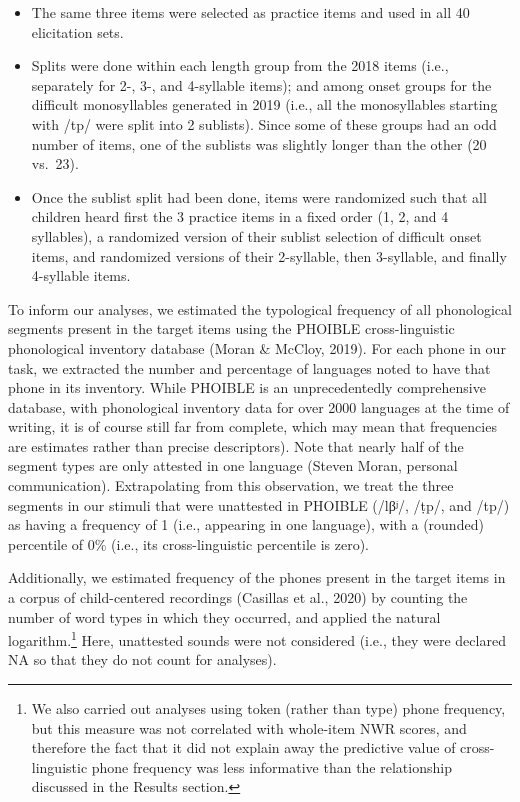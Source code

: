\documentclass[english,,man,floatsintext]{apa6}
\providecommand{\tightlist}{%
  \setlength{\itemsep}{0pt}\setlength{\parskip}{0pt}}
\begin{document}
\begin{itemize}
\tightlist
\item
  The same three items were selected as practice items and used in all 40 elicitation sets.
\item
  Splits were done within each length group from the 2018 items (i.e., separately for 2-, 3-, and 4-syllable items); and among onset groups for the difficult monosyllables generated in 2019 (i.e., all the monosyllables starting with /tp/ were split into 2 sublists). Since some of these groups had an odd number of items, one of the sublists was slightly longer than the other (20 vs.~23).
\item
  Once the sublist split had been done, items were randomized such that all children heard first the 3 practice items in a fixed order (1, 2, and 4 syllables), a randomized version of their sublist selection of difficult onset items, and randomized versions of their 2-syllable, then 3-syllable, and finally 4-syllable items.
\end{itemize}

To inform our analyses, we estimated the typological frequency of all phonological segments present in the target items using the PHOIBLE cross-linguistic phonological inventory database (Moran \& McCloy, 2019). For each phone in our task, we extracted the number and percentage of languages noted to have that phone in its inventory. While PHOIBLE is an unprecedentedly comprehensive database, with phonological inventory data for over 2000 languages at the time of writing, it is of course still far from complete, which may mean that frequencies are estimates rather than precise descriptors). Note that nearly half of the segment types are only attested in one language (Steven Moran, personal communication). Extrapolating from this observation, we treat the three segments in our stimuli that were unattested in PHOIBLE (/lβʲ/, /ṭp/, and /tp/) as having a frequency of 1 (i.e., appearing in one language), with a (rounded) percentile of 0\% (i.e., its cross-linguistic percentile is zero).

Additionally, we estimated frequency of the phones present in the target items in a corpus of child-centered recordings (Casillas et al., 2020) by counting the number of word types in which they occurred, and applied the natural logarithm.\footnote{We also carried out analyses using token (rather than type) phone frequency, but this measure was not correlated with whole-item NWR scores, and therefore the fact that it did not explain away the predictive value of cross-linguistic phone frequency was less informative than the relationship discussed in the Results section.} Here, unattested sounds were not considered (i.e., they were declared NA so that they do not count for analyses).
\end{document}
